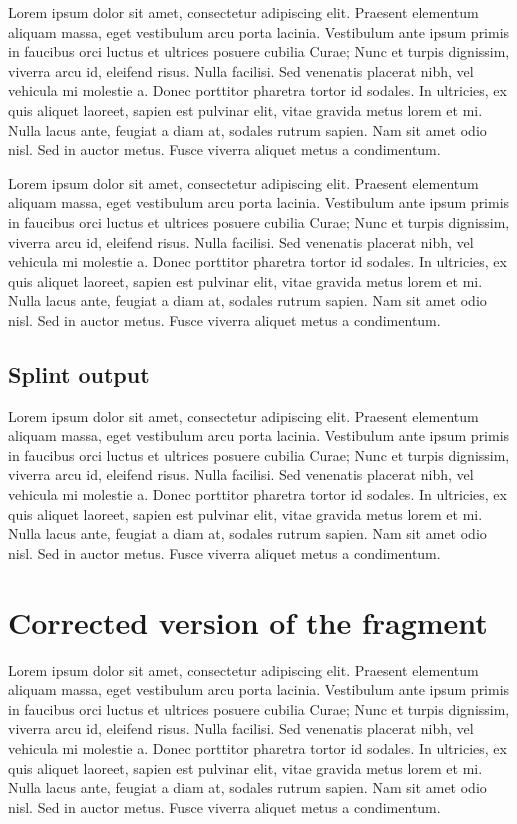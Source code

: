 \documentclass[a4paper,12pt]{article}
\begin{document}
Lorem ipsum dolor sit amet, consectetur adipiscing elit. Praesent elementum aliquam massa, eget vestibulum arcu porta lacinia. Vestibulum ante ipsum primis in faucibus orci luctus et ultrices posuere cubilia Curae; Nunc et turpis dignissim, viverra arcu id, eleifend risus. Nulla facilisi. Sed venenatis placerat nibh, vel vehicula mi molestie a. Donec porttitor pharetra tortor id sodales. In ultricies, ex quis aliquet laoreet, sapien est pulvinar elit, vitae gravida metus lorem et mi. Nulla lacus ante, feugiat a diam at, sodales rutrum sapien. Nam sit amet odio nisl. Sed in auctor metus. Fusce viverra aliquet metus a condimentum.


Lorem ipsum dolor sit amet, consectetur adipiscing elit. Praesent elementum aliquam massa, eget vestibulum arcu porta lacinia. Vestibulum ante ipsum primis in faucibus orci luctus et ultrices posuere cubilia Curae; Nunc et turpis dignissim, viverra arcu id, eleifend risus. Nulla facilisi. Sed venenatis placerat nibh, vel vehicula mi molestie a. Donec porttitor pharetra tortor id sodales. In ultricies, ex quis aliquet laoreet, sapien est pulvinar elit, vitae gravida metus lorem et mi. Nulla lacus ante, feugiat a diam at, sodales rutrum sapien. Nam sit amet odio nisl. Sed in auctor metus. Fusce viverra aliquet metus a condimentum.

\subsection{Splint output}
Lorem ipsum dolor sit amet, consectetur adipiscing elit. Praesent elementum aliquam massa, eget vestibulum arcu porta lacinia. Vestibulum ante ipsum primis in faucibus orci luctus et ultrices posuere cubilia Curae; Nunc et turpis dignissim, viverra arcu id, eleifend risus. Nulla facilisi. Sed venenatis placerat nibh, vel vehicula mi molestie a. Donec porttitor pharetra tortor id sodales. In ultricies, ex quis aliquet laoreet, sapien est pulvinar elit, vitae gravida metus lorem et mi. Nulla lacus ante, feugiat a diam at, sodales rutrum sapien. Nam sit amet odio nisl. Sed in auctor metus. Fusce viverra aliquet metus a condimentum.

\newpage
\section{Corrected version of the fragment}
Lorem ipsum dolor sit amet, consectetur adipiscing elit. Praesent elementum aliquam massa, eget vestibulum arcu porta lacinia. Vestibulum ante ipsum primis in faucibus orci luctus et ultrices posuere cubilia Curae; Nunc et turpis dignissim, viverra arcu id, eleifend risus. Nulla facilisi. Sed venenatis placerat nibh, vel vehicula mi molestie a. Donec porttitor pharetra tortor id sodales. In ultricies, ex quis aliquet laoreet, sapien est pulvinar elit, vitae gravida metus lorem et mi. Nulla lacus ante, feugiat a diam at, sodales rutrum sapien. Nam sit amet odio nisl. Sed in auctor metus. Fusce viverra aliquet metus a condimentum.
\end{document}
